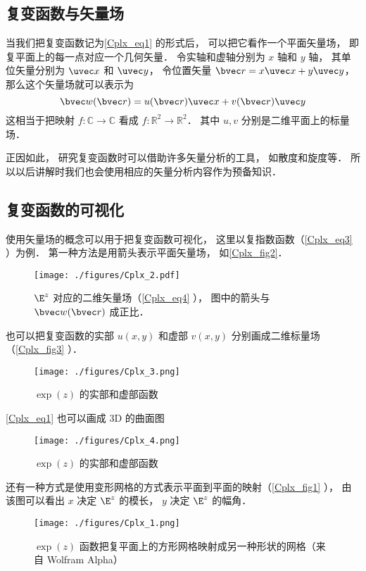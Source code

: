 \subsection{复变函数与矢量场}
当我们把复变函数记为\autoref{Cplx_eq1} 的形式后， 可以把它看作一个平面矢量场， 即复平面上的每一点对应一个几何矢量． 令实轴和虚轴分别为 $x$ 轴和 $y$ 轴， 其单位矢量分别为 $\uvec x$ 和 $\uvec y$， 令位置矢量 $\bvec r = x \uvec x + y \uvec y$， 那么这个矢量场就可以表示为
\begin{equation}\label{Cplx_eq4}
\bvec w(\bvec r) = u(\bvec r) \uvec x + v(\bvec r) \uvec y
\end{equation}
这相当于把映射 $f:\mathbb C \to \mathbb C$ 看成 $f: \mathbb R^2 \to \mathbb R^2$． 其中 $u, v$ 分别是二维平面上的标量场．

正因如此， 研究复变函数时可以借助许多矢量分析的工具， 如散度和旋度等． 所以以后讲解时我们也会使用相应的矢量分析内容作为预备知识．

\subsection{复变函数的可视化}
使用矢量场的概念可以用于把复变函数可视化， 这里以复指数函数（\autoref{Cplx_eq3} ）为例． 第一种方法是用箭头表示平面矢量场， 如\autoref{Cplx_fig2}．
\begin{figure}[ht]
\centering
\texttt{[image: ./figures/Cplx\_2.pdf]}
\caption{$\E^z$ 对应的二维矢量场（\autoref{Cplx_eq4} ）， 图中的箭头与 $\bvec w(\bvec r)$ 成正比．} \label{Cplx_fig2}
\end{figure}
也可以把复变函数的实部 $u(x,y)$ 和虚部 $v(x, y)$ 分别画成二维标量场（\autoref{Cplx_fig3} ）．
\begin{figure}[ht]
\centering
\texttt{[image: ./figures/Cplx\_3.png]}
\caption{$\exp(z)$ 的实部和虚部函数} \label{Cplx_fig3}
\end{figure}
\autoref{Cplx_eq1} 也可以画成 3D 的曲面图
\begin{figure}[ht]
\centering
\texttt{[image: ./figures/Cplx\_4.png]}
\caption{$\exp(z)$ 的实部和虚部函数} \label{Cplx_fig4}
\end{figure}

还有一种方式是使用变形网格的方式表示平面到平面的映射（\autoref{Cplx_fig1} ）， 由该图可以看出 $x$ 决定 $\E^z$ 的模长， $y$ 决定 $\E^z$ 的幅角．
\begin{figure}[ht]
\centering
\texttt{[image: ./figures/Cplx\_1.png]}
\caption{$\exp(z)$ 函数把复平面上的方形网格映射成另一种形状的网格（来自 Wolfram Alpha）} \label{Cplx_fig1}
\end{figure}

